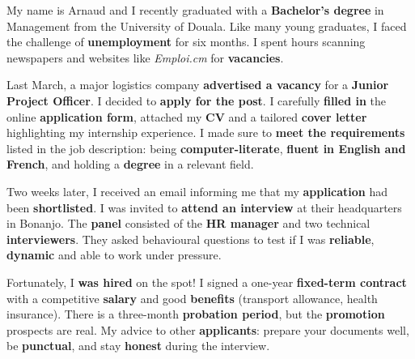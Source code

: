 \documentclass[11pt]{article}
\begin{document}
\begin{textebox}
My name is Arnaud and I recently graduated with a \textbf{Bachelor's degree} in Management from the University of Douala. Like many young graduates, I faced the challenge of \textbf{unemployment} for six months. I spent hours scanning newspapers and websites like \textit{Emploi.cm} for \textbf{vacancies}. 

Last March, a major logistics company \textbf{advertised a vacancy} for a \textbf{Junior Project Officer}. I decided to \textbf{apply for the post}. I carefully \textbf{filled in} the online \textbf{application form}, attached my \textbf{CV} and a tailored \textbf{cover letter} highlighting my internship experience. I made sure to \textbf{meet the requirements} listed in the job description: being \textbf{computer-literate}, \textbf{fluent in English and French}, and holding a \textbf{degree} in a relevant field.

Two weeks later, I received an email informing me that my \textbf{application} had been \textbf{shortlisted}. I was invited to \textbf{attend an interview} at their headquarters in Bonanjo. The \textbf{panel} consisted of the \textbf{HR manager} and two technical \textbf{interviewers}. They asked behavioural questions to test if I was \textbf{reliable}, \textbf{dynamic} and able to work under pressure. 

Fortunately, I \textbf{was hired} on the spot! I signed a one-year \textbf{fixed-term contract} with a competitive \textbf{salary} and good \textbf{benefits} (transport allowance, health insurance). There is a three-month \textbf{probation period}, but the \textbf{promotion} prospects are real. My advice to other \textbf{applicants}: prepare your documents well, be \textbf{punctual}, and stay \textbf{honest} during the interview.
\end{textebox}
\end{document}
